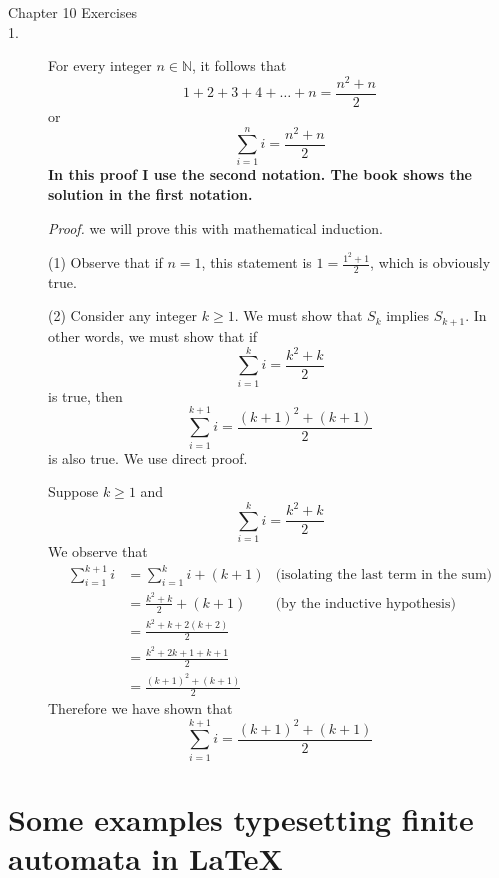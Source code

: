 \documentclass{article}
\begin{document}
\begin{description}
\item[Chapter 10 Exercises]

\item[1.] For every integer $n\in\mathbb{N}$, it follows that
  \[
  1 + 2 + 3 + 4 + \ldots + n  = \frac{n^2 + n}{2}
  \]
  or
  \[
  \sum_{i=1}^{n} i  = \frac{n^2 + n}{2}
  \]
  {\bf In this proof I use the second notation.  The book shows the
  solution in the first notation.}

  {\em Proof.}  we will prove this with mathematical induction.

  (1) Observe that if $n=1$, this statement is $1=\frac{1^2 + 1}{2}$,
  which is obviously true.

  (2) Consider any integer $k \geq 1$.  We must show that $S_k$
  implies $S_{k+1}$.  In other words, we must show that if
  \[
  \sum_{i=1}^{k} i = \frac{k^2+k}{2}
  \]
  is true, then
  \[
  \sum_{i=1}^{k+1} i = \frac{(k+1)^2+(k+1)}{2}
  \]
  is also true.  We use direct proof.

  Suppose $k\geq 1$ and 
  \[
  \sum_{i=1}^{k} i = \frac{k^2+k}{2}
  \]
  We observe that
  \begin{align*}
    \sum_{i=1}^{k+1} i
    &= \sum_{i=1}^{k} i + (k+1) &\text{(isolating the last term in the sum)} \\
    &= \frac{k^2+k}{2} + (k+1) & \text{(by the inductive hypothesis)}\\
    &= \frac{k^2 + k + 2(k+2)}{2} \\
    &= \frac{k^2 + 2k + 1 + k + 1}{2}\\
    &= \frac{(k+1)^2 + (k+1)}{2}
  \end{align*}
  Therefore we have shown that 
  \[
  \sum_{i=1}^{k+1} i = \frac{(k+1)^2+(k+1)}{2}
  \]

\end{description}



\section{Some examples typesetting finite automata in \LaTeX}
\end{document}
